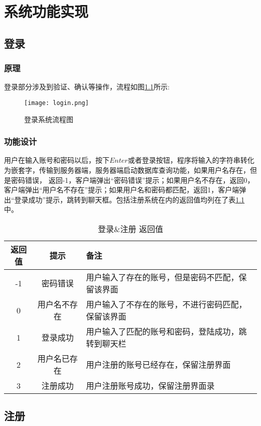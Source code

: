 \documentclass[forprint]{OSPaper}
\begin{document}
\chapter{系统功能实现}

\section{登录}
\subsection{原理}
登录部分涉及到验证、确认等操作，流程如图\ref{fig:8}所示:

\begin{figure}[ht]
	\centering
	\texttt{[image: login.png]}
	\caption{登录系统流程图}
	\label{fig:8}
\end{figure}

\subsection{功能设计}

用户在输入账号和密码以后，按下$Enter$或者登录按钮，程序将输入的字符串转化为嵌套字，传输到服务器端，服务器端启动数据库查询功能，如果用户名存在，但是密码错误，
返回-1，客户端弹出“密码错误”提示；如果用户名不存在，返回0，客户端弹出“用户名不存在”提示；如果用户名和密码都匹配，返回1，客户端弹出“登录成功”提示，跳转到聊天框。包括注册系统在内的返回值均列在了表\ref{table:3}中。
\begin{table}[]
		\caption{登录\&注册 返回值}
	\label{table:3}
	\begin{tabular}{ccl}
		\hline
		返回值 & 提示     & 备注                         \\ \hline
		-1  & 密码错误   & 用户输入了存在的账号，但是密码不匹配，保留该界面   \\
		0   & 用户名不存在 & 用户输入了不存在的账号，不进行密码匹配，保留该界面  \\
		1   & 登录成功   & 用户输入了匹配的账号和密码，登陆成功，跳转到聊天栏  \\
		2   & 用户名已存在 & 用户注册的账号已经存在，保留注册界面         \\
		3   & 注册成功   & 用户注册账号成功，保留注册界面录 \\ \hline
	\end{tabular}
\end{table}

\section{注册}
\end{document}
